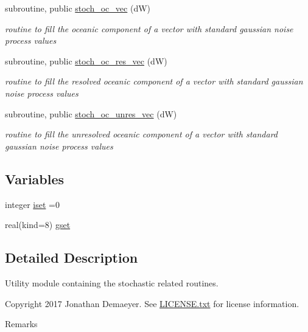 \begin{DoxyCompactItemize}
subroutine, public \hyperlink{namespacestoch__mod_a16dca233d3cc2bae3d2dd878ffa09573}{stoch\+\_\+oc\+\_\+vec} (dW)
\begin{DoxyCompactList}\small\item\em routine to fill the oceanic component of a vector with standard gaussian noise process values \end{DoxyCompactList}\item 
subroutine, public \hyperlink{namespacestoch__mod_a5755bfeff5833b9a8bda92ec2d940f0b}{stoch\+\_\+oc\+\_\+res\+\_\+vec} (dW)
\begin{DoxyCompactList}\small\item\em routine to fill the resolved oceanic component of a vector with standard gaussian noise process values \end{DoxyCompactList}\item 
subroutine, public \hyperlink{namespacestoch__mod_a54d51f19303ab07c03b861022a4f149e}{stoch\+\_\+oc\+\_\+unres\+\_\+vec} (dW)
\begin{DoxyCompactList}\small\item\em routine to fill the unresolved oceanic component of a vector with standard gaussian noise process values \end{DoxyCompactList}\end{DoxyCompactItemize}
\subsection*{Variables}
\begin{DoxyCompactItemize}
\item 
integer \hyperlink{namespacestoch__mod_a266187af9a49e162926a5ef2d67e141a}{iset} =0
\item 
real(kind=8) \hyperlink{namespacestoch__mod_a15f89f8abf449fad0aea548852af1e60}{gset}
\end{DoxyCompactItemize}


\subsection{Detailed Description}
Utility module containing the stochastic related routines. 

\begin{DoxyCopyright}{Copyright}
2017 Jonathan Demaeyer. See \hyperlink{LICENSE_8txt}{L\+I\+C\+E\+N\+S\+E.\+txt} for license information. 
\end{DoxyCopyright}
\begin{DoxyRemark}{Remarks}

\end{DoxyRemark}


